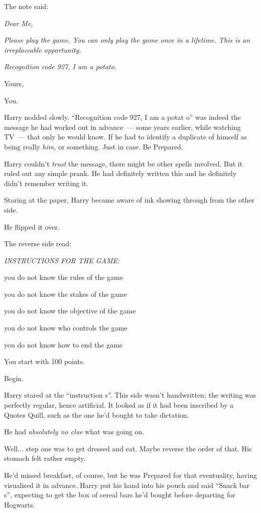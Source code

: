 The note said:

\emph{Dear Me,}

\emph{Please play the game. You can only play the game once in a lifetime. This is an irreplaceable opportunity.}

\emph{Recognition code 927, I am a potato.}

Yours,

You.

Harry nodded slowly. ``Recognition code 927, I am a potat o'' was indeed the message he had worked out in advance~--- some years earlier, while watching TV~--- that only he would know. If he had to identify a duplicate of himself as being really \emph{him,} or something. Just in case. Be Prepared.

Harry couldn't \emph{trust} the message, there might be other spells involved. But it ruled out any simple prank. He had definitely written this and he definitely didn't remember writing it.

Staring at the paper, Harry became aware of ink showing through from the other side.

He flipped it over.

The reverse side read:

\emph{INSTRUCTIONS FOR THE GAME:}

you do not know the rules of the game

you do not know the stakes of the game

you do not know the objective of the game

you do not know who controls the game

you do not know how to end the game

You start with 100 points.

Begin.

Harry stared at the ``instruction s''. This side wasn't handwritten; the writing was perfectly regular, hence artificial. It looked as if it had been inscribed by a Quotes Quill, such as the one he'd bought to take dictation.

He had \emph{absolutely no clue} what was going on.

Well... step one was to get dressed and eat. Maybe reverse the order of that. His stomach felt rather empty.

He'd missed breakfast, of course, but he was Prepared for that eventuality, having visualised it in advance. Harry put his hand into his pouch and said ``Snack bar s'', expecting to get the box of cereal bars he'd bought before departing for Hogwarts.

